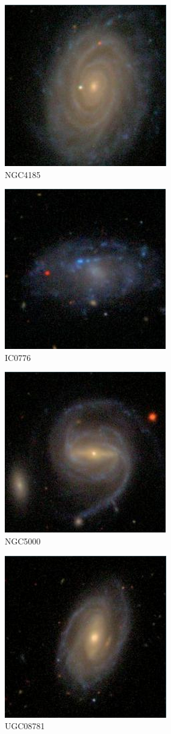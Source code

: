 \documentclass[9pt]{revtex4-1}
\begin{document}
\begin{figure}
\includegraphics[scale=0.3]{NGC4185}
\caption{NGC4185}
\end{figure}
\begin{figure}
\includegraphics[scale=0.3]{IC0776.png}
\caption{IC0776}
\end{figure}
\begin{figure}
\includegraphics[scale=0.3]{NGC5000.png}
\caption{NGC5000}
\end{figure}
\begin{figure}
\includegraphics[scale=0.3]{UGC08781.png}
\caption{UGC08781}
\end{figure}
\end{document}
